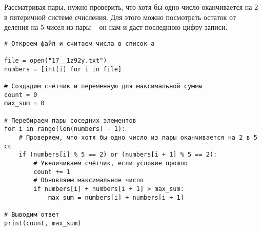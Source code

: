 \documentclass[14pt,a4paper]{article}
\begin{document}
Рассматривая пары, нужно проверить, что хотя бы одно число
оканчивается на 2 в пятеричной системе счисления. Для этого можно
посмотреть остаток от деления на 5 чисел из пары -- он нам и даст
последнюю цифру записи.

\begin{verbatim}
# Откроем файл и считаем числа в список a

file = open("17__1z92y.txt")
numbers = [int(i) for i in file]

# Создадим счётчик и переменную для максимальной суммы
count = 0
max_sum = 0

# Перебираем пары соседних элементов
for i in range(len(numbers) - 1):
    # Проверяем, что хотя бы одно число из пары оканчивается на 2 в 5 сс
    if (numbers[i] % 5 == 2) or (numbers[i + 1] % 5 == 2):
        # Увеличиваем счётчик, если условие прошло
        count += 1
        # Обновляем максимальное число
        if numbers[i] + numbers[i + 1] > max_sum:
            max_sum = numbers[i] + numbers[i + 1]

# Выводим ответ
print(count, max_sum)
\end{verbatim}
\end{document}
